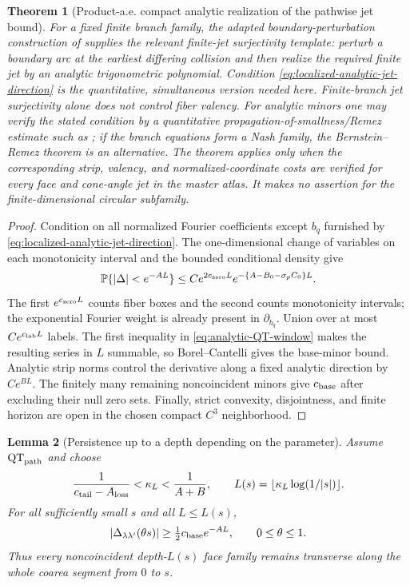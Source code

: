 \documentclass[11pt]{article}
\newtheorem{theorem}{Theorem}[section]
\newtheorem{lemma}[theorem]{Lemma}
\begin{document}
\begin{theorem}[Product-a.e. compact analytic realization of the pathwise jet bound]
For a fixed finite branch family, the adapted boundary-perturbation
construction of \cite{BFLS2026} supplies the relevant finite-jet
surjectivity template: perturb a boundary arc at the earliest differing
collision and then realize the required finite jet by an analytic
trigonometric polynomial.  Condition
\eqref{eq:localized-analytic-jet-direction} is the quantitative, simultaneous
version needed here.  Finite-branch jet surjectivity alone does not control
fiber valency.  For analytic minors one may verify the stated condition by a
quantitative propagation-of-smallness/Remez estimate such as
\cite{HWWRemez}; if the branch equations form a Nash family, the
Bernstein--Remez theorem \cite{BarbieriNash} is an alternative.  The theorem
applies only when the corresponding strip, valency, and normalized-coordinate
costs are verified for every face and cone-angle jet in the master atlas.  It
makes no assertion for the finite-dimensional circular subfamily.
\end{theorem}

\begin{proof}
Condition on all normalized Fourier coefficients except $b_q$ furnished
by \eqref{eq:localized-analytic-jet-direction}.  The one-dimensional change
of variables on each monotonicity interval and the bounded conditional density
give
\[
 \mathbb P\{|\Delta|<e^{-AL}\}
 \le C e^{2c_{\rm zero}L}
 e^{-\{A-B_0-\sigma_pC_0\}L}.
\]
The first $e^{c_{\rm zero}L}$ counts fiber boxes and the second counts
monotonicity intervals; the exponential Fourier weight is already present in
$\partial_{b_q}$.  Union over at most $Ce^{c_{\rm lab}L}$ labels.  The first inequality
in \eqref{eq:analytic-QT-window} makes the resulting series in $L$
summable, so Borel--Cantelli gives the base-minor bound.  Analytic strip norms
control the derivative along a fixed analytic direction by $Ce^{BL}$.
The finitely many remaining noncoincident minors give $c_{\rm base}$ after
excluding their null zero sets.  Finally, strict convexity, disjointness, and finite horizon are
open in the chosen compact $C^3$ neighborhood.
\end{proof}

\begin{lemma}[Persistence up to a depth depending on the parameter]
\label{lem:finite-depth-face-separation}
Assume $\mathrm{QT}_{\rm path}$ and choose
\begin{equation}
\label{eq:kappa-path-window}
 \frac1{c_{\rm tail}-A_{\rm loss}}<\kappa_L<\frac1{A+B},
 \qquad L(s)=\lfloor\kappa_L\log(1/|s|)\rfloor.
\end{equation}
For all sufficiently small $s$ and all $L\le L(s)$,
\[
 |\Delta_{\lambda\lambda'}(\theta s)|\ge\tfrac12c_{\rm base}e^{-AL},
 \qquad 0\le\theta\le1.
\]
Thus every noncoincident depth-$L(s)$ face family remains transverse along the
whole coarea segment from $0$ to $s$.
\end{lemma}
\end{document}

